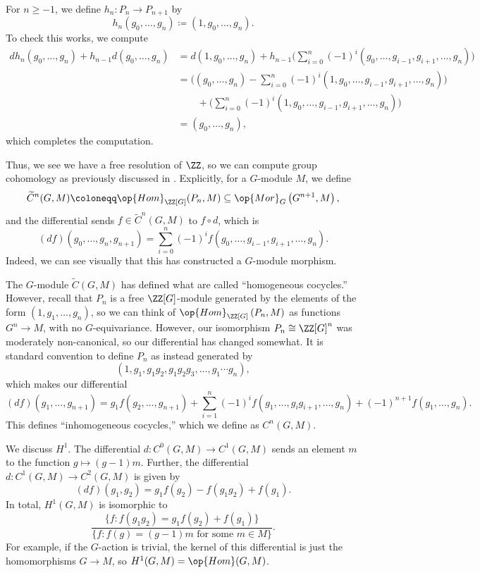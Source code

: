\documentclass[../notes.tex]{subfiles}
\begin{document}
\begin{itemize}
	For $n\ge-1$, we define $h_n\colon P_n\to P_{n+1}$ by
	\[h_n(g_0,\ldots,g_n)\coloneqq(1,g_0,\ldots,g_n).\]
	To check this works, we compute
	\begin{align*}
		dh_n(g_0,\ldots,g_n)+h_{n-1}d(g_0,\ldots,g_n) &= d(1,g_0,\ldots,g_n)+h_{n-1}\Bigg(\sum_{i=0}^n(-1)^i(g_0,\ldots,g_{i-1},g_{i+1},\ldots,g_n)\Bigg) \\
		&= \Bigg((g_0,\ldots,g_n)-\sum_{i=0}^n(-1)^i(1,g_0,\ldots,g_{i-1},g_{i+1},\ldots,g_n)\Bigg) \\
		&\qquad+\Bigg(\sum_{i=0}^n(-1)^i(1,g_0,\ldots,g_{i-1},g_{i+1},\ldots,g_n)\Bigg) \\
		&= (g_0,\ldots,g_n),
	\end{align*}
	which completes the computation.
\end{itemize}
Thus, we see we have a free resolution of $\ZZ$, so we can compute group cohomology as previously discussed in . Explicitly, for a $G$-module $M$, we define
\[\widetilde C^n(G,M)\coloneqq\op{Hom}_{\ZZ[G]}(P_n,M)\subseteq\op{Mor}_G\left(G^{n+1},M\right),\]
and the differential sends $f\in\widetilde C^n(G,M)$ to $f\circ d$, which is
\[(df)(g_0,\ldots,g_n,g_{n+1})=\sum_{i=0}^n(-1)^if(g_0,\ldots,g_{i-1},g_{i+1},\ldots,g_n).\]
Indeed, we can see visually that this has constructed a $G$-module morphism.

The $G$-module $\widetilde C(G,M)$ has defined what are called ``homogeneous cocycles.'' However, recall that $P_n$ is a free $\ZZ[G]$-module generated by the elements of the form $(1,g_1,\ldots,g_n)$, so we can think of $\op{Hom}_{\ZZ[G]}\left(P_n,M\right)$ as functions $G^n\to M$, with no $G$-equivariance. However, our isomorphism $P_n\cong\ZZ[G]^n$ was moderately non-canonical, so our differential has changed somewhat. It is standard convention to define $P_n$ as instead generated by
\[(1,g_1,g_1g_2,g_1g_2g_3,\ldots,g_1\cdots g_n),\]
which makes our differential
\[(df)(g_1,\ldots,g_{n+1})=g_1f(g_2,\ldots,g_{n+1})+\sum_{i=1}^n(-1)^if(g_1,\ldots,g_ig_{i+1},\ldots,g_n)+(-1)^{n+1}f(g_1,\ldots,g_n).\]
This defines ``inhomogeneous cocycles,'' which we define as $C^n(G,M)$.
\begin{example}
	We discuss $H^1$. The differential $d\colon C^0(G,M)\to C^1(G,M)$ sends an element $m$ to the function $g\mapsto(g-1)m$. Further, the differential $d\colon C^1(G,M)\to C^2(G,M)$ is given by
	\[(df)(g_1,g_2)=g_1f(g_2)-f(g_1g_2)+f(g_1).\]
	In total, $H^1(G,M)$ is isomorphic to
	\[\frac{\{f:f(g_1g_2)=g_1f(g_2)+f(g_1)\}}{\{f:f(g)=(g-1)m\text{ for some }m\in M\}}.\]
	For example, if the $G$-action is trivial, the kernel of this differential is just the homomorphisms $G\to M$, so $H^1(G,M)=\op{Hom}(G,M)$.
\end{example}
\end{document}
